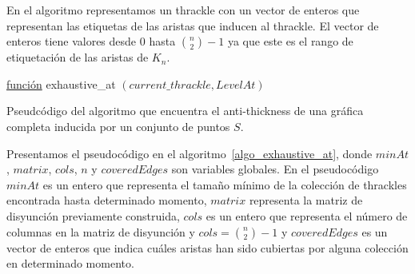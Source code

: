   En el algoritmo representamos un thrackle con un vector de enteros que representan las etiquetas de las
  aristas que inducen al thrackle. El vector de enteros tiene valores desde $0$ hasta $\binom{n}{2}-1$ ya que este es el rango de etiquetación de las aristas de $K_n$.
  \begin{algorithm}[p]
    \DontPrintSemicolon
    \underline{función} exhaustive\_at $ (current\_thrackle,LevelAt) $\;
    \caption{Pseudcódigo del algoritmo que encuentra el anti-thickness de una gráfica completa inducida por
    un conjunto de puntos $S$.}
    \label{algo_exhaustive_at}
  \end{algorithm}

  Presentamos el pseudocódigo en el algoritmo~\ref{algo_exhaustive_at}, donde
  $minAt$, $matrix$, $cols$, $n$ y $coveredEdges$ son variables globales. En el pseudocódigo $minAt$ es un
  entero que representa el tamaño mínimo de la colección de thrackles encontrada hasta determinado momento,
  $matrix$ representa la matriz de disyunción previamente construida, $cols$ es un entero que representa el
  número de columnas en la matriz de disyunción y $cols=\binom{n}{2}-1$ y $coveredEdges$ es un vector de
  enteros que indica cuáles aristas han sido cubiertas por alguna colección en determinado momento.

